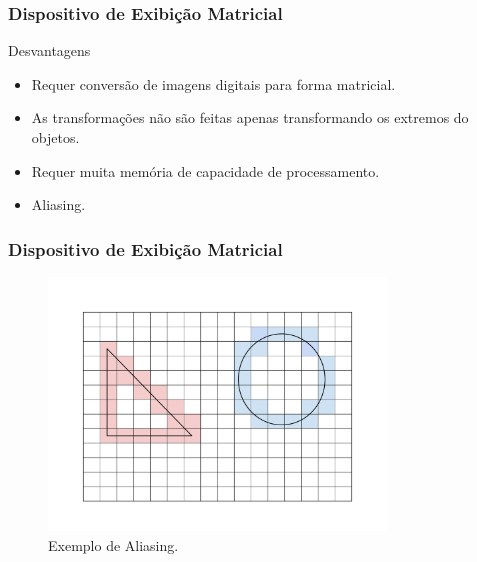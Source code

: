 \documentclass{beamer}
\begin{document}
\begin{frame}
\frametitle{Dispositivo de Exibição Matricial}

	\begin{block}{Desvantagens}
		\begin{itemize}
			\item Requer conversão de imagens digitais para forma matricial.
			\item As transformações não são feitas apenas transformando os extremos do objetos.
			\item Requer muita memória de capacidade de processamento.
			\item Aliasing.
		\end{itemize}
	
	\end{block}
	
\end{frame}



\begin{frame}
\frametitle{Dispositivo de Exibição Matricial}

	\begin{figure}[!h]
		\begin{center}
			\includegraphics[width=0.8\textwidth]{Figures/aliasing}
			\caption{Exemplo de Aliasing.}
		\end{center}
	\end{figure}
	
\end{frame}

\end{document}
